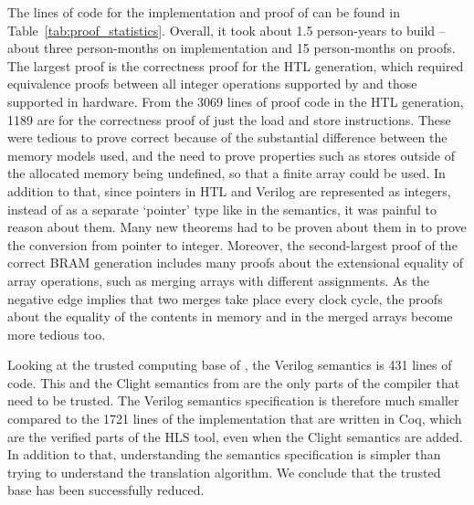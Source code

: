 The lines of code for the implementation and proof of \vericert{} can be found
in Table~\ref{tab:proof_statistics}.  Overall, it took about 1.5 person-years to
build \vericert{} -- about three person-months on implementation and 15
person-months on proofs.  The largest proof is the correctness proof for the HTL
generation, which required equivalence proofs between all integer operations
supported by \compcert{} and those supported in hardware.  From the 3069 lines
of proof code in the HTL generation, 1189 are for the correctness proof of just
the load and store instructions.  These were tedious to prove correct because of
the substantial difference between the memory models used, and the need to prove
properties such as stores outside of the allocated memory being undefined, so
that a finite array could be used. In addition to that, since pointers in HTL
and Verilog are represented as integers, instead of as a separate `pointer' type
like in the \compcert{} semantics, it was painful to reason about them.  Many
new theorems had to be proven about them in \vericert{} to prove the conversion
from pointer to integer.  Moreover, the second-largest proof of the correct
\gls{BRAM} generation includes many proofs about the extensional equality of
array operations, such as merging arrays with different assignments.  As the
negative edge implies that two merges take place every clock cycle, the proofs
about the equality of the contents in memory and in the merged arrays become
more tedious too.

Looking at the trusted computing base of \vericert{}, the Verilog semantics is
431 lines of code.  This and the Clight semantics from \compcert{} are the only
parts of the compiler that need to be trusted.  The Verilog semantics
specification is therefore much smaller compared to the 1721 lines of the
implementation that are written in Coq, which are the verified parts of the HLS
tool, even when the Clight semantics are added.  In addition to that,
understanding the semantics specification is simpler than trying to understand
the translation algorithm. We conclude that the trusted base has been
successfully reduced.

